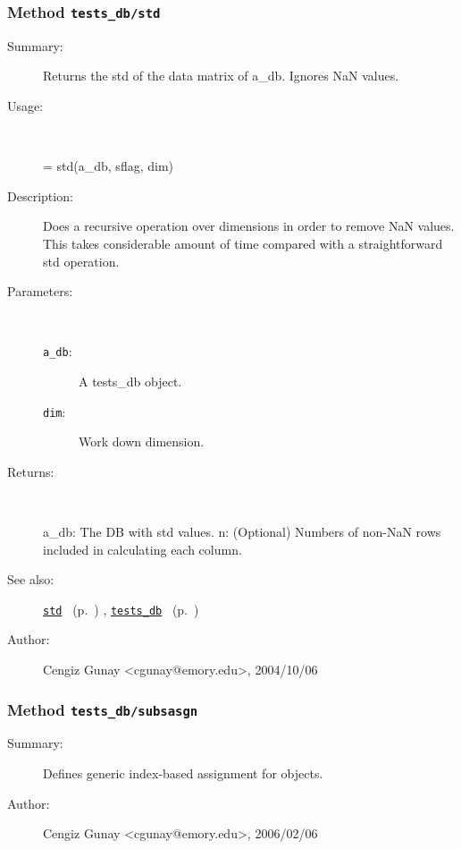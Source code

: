\subsubsection[Method \texttt{std}]{Method \texttt{tests\_db/std}}%
%
\label{ref_tests_db__std}%
\hypertarget{ref_tests_db__std}{}%
\begin{description}
\item[Summary:]Returns the std of the data matrix of a\_db. Ignores NaN values.
%
\item[Usage:]~%
\begin{lyxcode}%
[a\_db, n] = std(a\_db, sflag, dim)
%
\end{lyxcode}%
%
\item[Description:]%
Does a recursive operation over dimensions in order to remove NaN values.
 This takes considerable amount of time compared with a straightforward std
 operation. 
\item[Parameters:]~
\begin{description}%
\item[\texttt{a\_db}:]
 A tests\_db object.
\item[\texttt{dim}:]
 Work down dimension.
\end{description}%
%
\item[Returns:
]~

	a\_db: The DB with std values.
	n: (Optional) Numbers of non-NaN rows included in calculating each column.
%
%
\item[See also:]%
\hyperlink{ref_std}{\texttt{std}}%
\ (p.~\pageref{ref_std})%
%
, \hyperlink{ref_tests_db}{\texttt{tests\_db}}%
\ (p.~\pageref{ref_tests_db})%
%
%
\item[Author:]%
Cengiz Gunay <cgunay@emory.edu>, 2004/10/06
%
\end{description}
\methodline%
\subsubsection[Method \texttt{subsasgn}]{Method \texttt{tests\_db/subsasgn}}%
%
\label{ref_tests_db__subsasgn}%
\hypertarget{ref_tests_db__subsasgn}{}%
\begin{description}
\item[Summary:]Defines generic index-based assignment for objects.
%
%
%
%
%
%
%
\item[Author:]%
Cengiz Gunay <cgunay@emory.edu>, 2006/02/06
%
\end{description}
\methodline%

